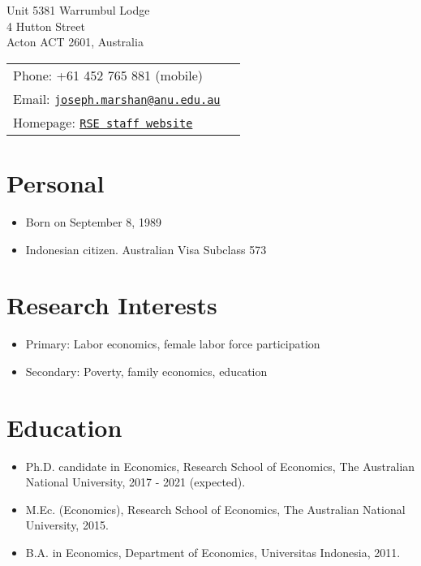 {\huge \name}


\vspace{0.25in}

\begin{minipage}{0.45\linewidth}
  Unit 5381 Warrumbul Lodge\\
  4 Hutton Street\\
  Acton ACT 2601, Australia
\end{minipage}
\begin{minipage}{0.45\linewidth}
  \begin{tabular}{ll}
    Phone: +61 452 765 881 (mobile)  \\
    Email: \href{mailto:joseph.marshan@anu.edu.au}{\tt joseph.marshan@anu.edu.au} \\
    Homepage:  \href{https://www.rse.anu.edu.au/about-us/our-people/people/?profile=Joseph-Marshan}{\tt RSE staff website} \\
  \end{tabular}
\end{minipage}


\section*{Personal}

\begin{itemize}
\item Born on September 8, 1989
\item Indonesian citizen. Australian Visa Subclass 573
\end{itemize}

\section*{Research Interests}
\begin{itemize}
	\item Primary: Labor economics, female labor force participation
	\item Secondary: Poverty, family economics, education
\end{itemize}


\section*{Education}

\begin{itemize}
  \item Ph.D. candidate in Economics, Research School of Economics, The Australian National University, 2017 - 2021 (expected).

  \item M.Ec. (Economics), Research School of Economics, The Australian National University, 2015.

  \item B.A. in Economics, Department of Economics, Universitas Indonesia, 2011.

\end{itemize}


